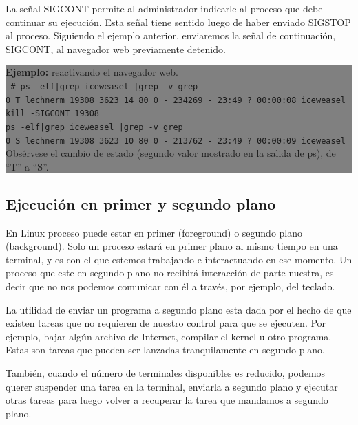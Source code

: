 \documentclass[12pt]{article}
\begin{document}
La señal SIGCONT permite al administrador indicarle al proceso que debe 
continuar su ejecución. Esta señal tiene sentido luego de haber enviado 
SIGSTOP al proceso. Siguiendo el ejemplo anterior, enviaremos la señal de
continuación, SIGCONT, al navegador web previamente detenido.  


\colorbox{grey}{\parbox[t]{0.95\linewidth}{ \vspace*{0.5cm} { 
{\bf Ejemplo:} reactivando el navegador web. \\
{\tt
\# ps -elf|grep iceweasel |grep -v grep  \\
0 T lechnerm 19308  3623 14  80   0 - 234269 -     23:49 ?    00:00:08 iceweasel \\

kill -SIGCONT 19308 \\

ps -elf|grep iceweasel |grep -v grep  \\
0 S lechnerm 19308  3623 10  80   0 - 213762 -     23:49 ?    00:00:09 iceweasel \\
}
Obsérvese el cambio de estado (segundo valor mostrado en la salida de ps), 
de ``T'' a ``S''. 

} \vspace*{0.5cm} } }

\subsection*{Ejecución en primer y segundo plano}

En Linux proceso puede estar en primer (foreground) o segundo plano
(background). Solo un proceso estará en primer plano al mismo tiempo en
una terminal, y es con el que estemos trabajando e interactuando en ese 
momento. Un proceso que este en segundo plano no recibirá interacción  
de parte nuestra, es decir que no nos podemos comunicar con él 
a través, por ejemplo, del teclado. 

La utilidad de enviar un programa a 
segundo plano esta dada por el hecho de que existen tareas que no 
requieren de nuestro control para que se ejecuten. Por ejemplo, bajar 
algún archivo de Internet, compilar el kernel u otro programa. Estas son 
tareas que pueden ser lanzadas tranquilamente en segundo plano. 

También, cuando el número de terminales disponibles es reducido,  
podemos querer suspender una tarea en la terminal, enviarla a 
segundo plano y ejecutar otras tareas para luego volver a recuperar la 
tarea que mandamos a segundo plano. 
\end{document}
